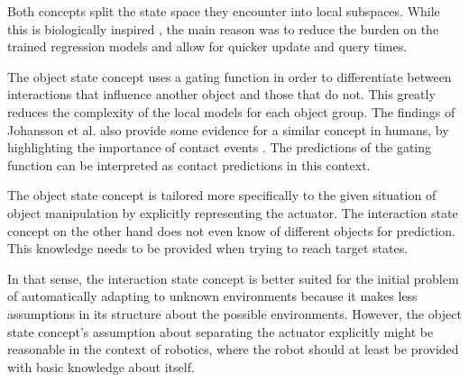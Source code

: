 Both concepts split the state space they encounter into local subspaces. While this is biologically inspired \cite{kawato1999internal}, the main reason was to reduce the burden on the trained regression models and allow for quicker update and query times.

The object state concept uses a gating function in order to differentiate between interactions that influence another object and those that do not. This greatly reduces the complexity of the local models for each object group. The findings of Johansson et al. also provide some evidence for a similar concept in humans, by highlighting the importance of contact events \cite{johansson2001eye}. The predictions of the gating function can be interpreted as contact predictions in this context.

The object state concept is tailored more specifically to the given situation of object manipulation by explicitly representing the actuator. The interaction state concept on the other hand does not even know of different objects for prediction. This knowledge needs to be provided when trying to reach target states.

In that sense, the interaction state concept is better suited for the initial problem of automatically adapting to unknown environments because it makes less assumptions in its structure about the possible environments. 
However, the object state concept's assumption about separating the actuator explicitly might be reasonable in the context of robotics, where the robot should at least be provided with basic knowledge about itself. 

